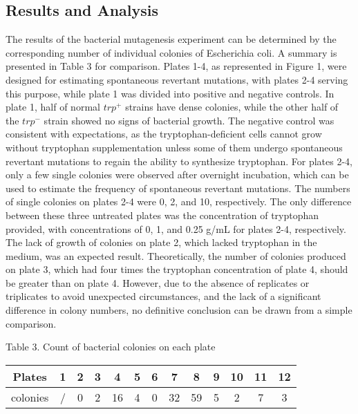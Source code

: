 \documentclass[a4paper,10pt]{article}
\begin{document}
\begin{multicols}{2}




\section{Results and Analysis}


The results of the bacterial mutagenesis experiment can be determined by the corresponding number of individual colonies of Escherichia coli. A summary is presented in Table 3 for comparison. Plates 1-4, as represented in Figure 1, were designed for estimating spontaneous revertant mutations, with plates 2-4 serving this purpose, while plate 1 was divided into positive and negative controls. In plate 1, half of normal $trp^+$ strains have dense colonies, while the other half of the $trp^-$ strain showed no signs of bacterial growth. The negative control was consistent with expectations, as the tryptophan-deficient cells cannot grow without tryptophan supplementation unless some of them undergo spontaneous revertant mutations to regain the ability to synthesize tryptophan. For plates 2-4, only a few single colonies were observed after overnight incubation, which can be used to estimate the frequency of spontaneous revertant mutations. The numbers of single colonies on plates 2-4 were 0, 2, and 10, respectively. The only difference between these three untreated plates was the concentration of tryptophan provided, with concentrations of 0, 1, and 0.25 \textmu g/mL for plates 2-4, respectively. The lack of growth of colonies on plate 2, which lacked tryptophan in the medium, was an expected result. Theoretically, the number of colonies produced on plate 3, which had four times the tryptophan concentration of plate 4, should be greater than on plate 4. However, due to the absence of replicates or triplicates to avoid unexpected circumstances, and the lack of a significant difference in colony numbers, no definitive conclusion can be drawn from a simple comparison.


\begin{center}
{\footnotesize Table 3. Count of bacterial colonies on each plate}
\vspace{0pt}
\begin{table}[H]
\setlength{\tabcolsep}{5pt}
\footnotesize
\begin{tabular}{ccccccccccccc}
\toprule [1pt]
Plates&1&2&3&4&5&6&7&8&9&10&11&12\\
\hline
colonies&/&0&2&16&4&0&32&59&5&2&7&3\\
\bottomrule [1pt]
\end{tabular}
\end{table}
\end{center}



\end{multicols}
\end{document}
